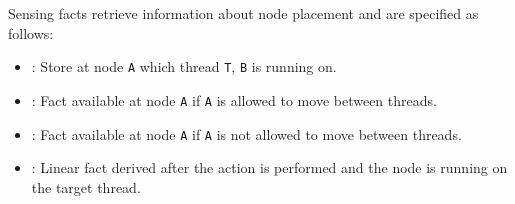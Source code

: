 Sensing facts retrieve information about node placement and are specified as
follows:

\begin{itemize}

   \item {}: Store at node \texttt{A} which
      thread \texttt{T}, \texttt{B} is running on.

   \item {}: Fact available at node \texttt{A} if
      \texttt{A} is allowed to move between threads.

   \item {}: Fact available at node \texttt{A} if
      \texttt{A} is not allowed to move between threads.

   \item {}: Linear fact derived after the
       action is performed and the node is running on the
      target thread.

\end{itemize}

